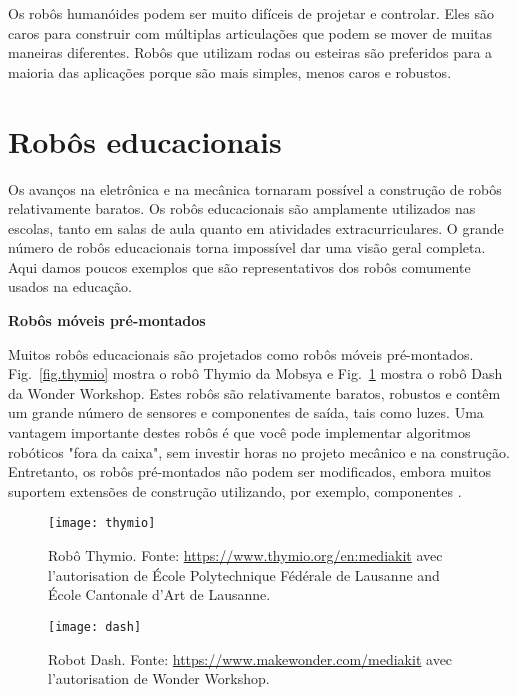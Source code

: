 Os robôs humanóides podem ser muito difíceis de projetar e controlar. Eles são caros para construir com múltiplas articulações que podem se mover de muitas maneiras diferentes. Robôs que utilizam rodas ou esteiras são preferidos para a maioria das aplicações porque são mais simples, menos caros e robustos.

\section{Robôs educacionais}\label{s.educational}

Os avanços na eletrônica e na mecânica tornaram possível a construção de robôs relativamente baratos. Os robôs educacionais são amplamente utilizados nas escolas, tanto em salas de aula quanto em atividades extracurriculares. O grande número de robôs educacionais torna impossível dar uma visão geral completa. Aqui damos poucos exemplos que são representativos dos robôs comumente usados na educação.

\medskip

\noindent\textbf{Robôs móveis pré-montados}

Muitos robôs educacionais são projetados como robôs móveis pré-montados. Fig.~\ref{fig.thymio} mostra o robô Thymio da Mobsya e Fig.~\ref{fig.dash} mostra o robô Dash da Wonder Workshop. Estes robôs são relativamente baratos, robustos e contêm um grande número de sensores e componentes de saída, tais como luzes. Uma vantagem importante destes robôs é que você pode implementar algoritmos robóticos "fora da caixa", sem investir horas no projeto mecânico e na construção. Entretanto, os robôs pré-montados não podem ser modificados, embora muitos suportem extensões de construção utilizando, por exemplo, componentes \lego{}.

\begin{figure}
\begin{minipage}{.45\textwidth}
\begin{center}
\texttt{[image: thymio]}
\caption{Robô Thymio. Fonte: \protect\url{https://www.thymio.org/en:mediakit} avec l'autorisation de \'{E}cole Polytechnique F\'{e}d\'{e}rale de Lausanne and \'{E}cole Cantonale d'Art de Lausanne.}\label{fig.thymio}
\end{center}
\end{minipage}
\hspace{\fill}
\begin{minipage}{.45\textwidth}
\begin{center}
\texttt{[image: dash]}
\caption{Robot Dash. Fonte: \protect\url{https://www.makewonder.com/mediakit} avec l'autorisation de Wonder Workshop.}\label{fig.dash}
\end{center}
\end{minipage}
\end{figure}

